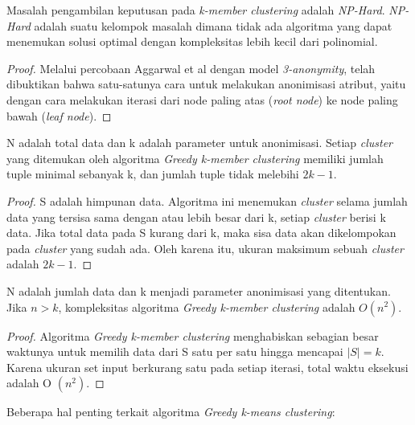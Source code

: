 \vspace{0.3cm}
\begin{theorem}
Masalah pengambilan keputusan pada \textit{k-member clustering} adalah \textit{NP-Hard}. \textit{NP-Hard} adalah suatu kelompok masalah dimana tidak ada algoritma yang dapat menemukan solusi optimal dengan kompleksitas lebih kecil dari polinomial.
\end{theorem}

\begin{proof}
Melalui percobaan Aggarwal et al dengan model \textit{3-anonymity}, telah dibuktikan bahwa satu-satunya cara untuk melakukan anonimisasi atribut, yaitu dengan cara melakukan iterasi dari node paling atas (\textit{root node}) ke node paling bawah (\textit{leaf node}).
\end{proof}

\begin{theorem}
N adalah total data dan k adalah parameter untuk anonimisasi. Setiap \textit{cluster} yang ditemukan oleh algoritma \textit{Greedy k-member clustering} memiliki jumlah tuple minimal sebanyak k, dan jumlah tuple tidak melebihi $2k - 1$.
\end{theorem}

\begin{proof}
S adalah himpunan data. Algoritma ini menemukan \textit{cluster} selama jumlah data yang tersisa sama dengan atau lebih besar dari k, setiap \textit{cluster} berisi k data. Jika total data pada S kurang dari k, maka sisa data akan dikelompokan pada  \textit{cluster} yang sudah ada. Oleh karena itu, ukuran maksimum sebuah \textit{cluster} adalah $2k - 1$.
\end{proof}

\begin{theorem}
N adalah jumlah data dan k menjadi parameter anonimisasi yang ditentukan. Jika $n > k$, kompleksitas algoritma \textit{Greedy k-member clustering} adalah $O(n^2)$.
\end{theorem}

\begin{proof}
Algoritma \textit{Greedy k-member clustering} menghabiskan sebagian besar waktunya untuk memilih data dari S satu per satu hingga mencapai $|S| = k$. Karena ukuran set input berkurang satu pada setiap iterasi, total waktu eksekusi adalah O $(n^2)$.
\end{proof}

\vspace{0.5cm}
\noindent Beberapa hal penting terkait algoritma \textit{Greedy k-means clustering}:

